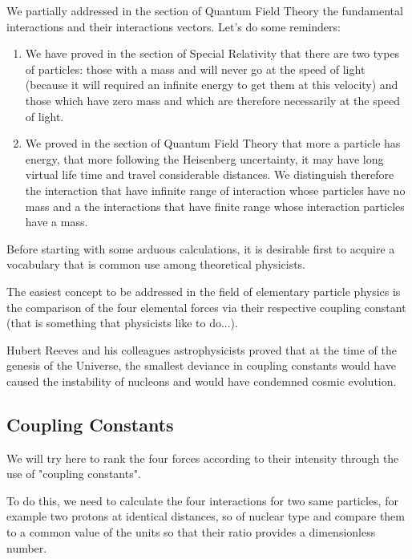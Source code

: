	We partially addressed in the section of Quantum Field Theory the fundamental interactions and their interactions vectors. Let's do some reminders:
	\begin{enumerate}
		\item We have proved in the section of Special Relativity that there are two types of particles: those with a mass and will never go at the speed of light (because it will required an infinite energy to get them at this velocity) and those which have zero mass and which are therefore necessarily at the speed of light.
		\item We proved in the section of Quantum Field Theory that more a particle has energy, that more following the Heisenberg uncertainty, it may have long virtual life time and travel considerable distances. We distinguish therefore the interaction that have infinite range of interaction whose particles have no mass and a the interactions that have finite range whose interaction particles have a mass.
	\end{enumerate}
	Before starting with some arduous calculations, it is desirable first to acquire a vocabulary that is common use among theoretical physicists.
	
	The easiest concept to be addressed in the field of elementary particle physics is the comparison of the four elemental forces via their respective coupling constant (that is something that physicists like to do...).
	
	\begin{tcolorbox}[title=Remark,colframe=black,arc=10pt]
	Hubert Reeves and his colleagues astrophysicists proved that at the time of the genesis of the Universe, the smallest deviance in coupling constants would have caused the instability of nucleons and would have condemned cosmic evolution.
	\end{tcolorbox}
	
	\subsection{Coupling Constants}
	
	We will try here to rank the four forces according to their intensity through the use of "coupling constants".
	
	To do this, we need to calculate the four interactions for two same particles, for example two protons at identical distances, so of nuclear type and compare them to a common value of the units so that their ratio provides a dimensionless number.
	
